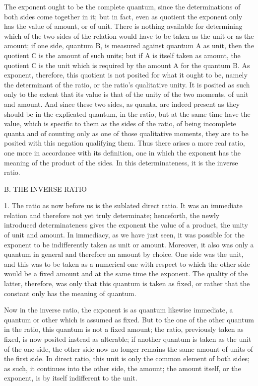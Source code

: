 The exponent ought to be the complete quantum,
since the determinations of both sides come together in it;
but in fact, even as quotient the exponent
only has the value of amount, or of unit.
There is nothing available for determining
which of the two sides of the relation would have to
be taken as the unit or as the amount;
if one side, quantum B,
is measured against quantum A as unit,
then the quotient C is the amount of such units;
but if A is itself taken as amount,
the quotient C is the unit which is required by
the amount A for the quantum B.
As exponent, therefore, this quotient is
not posited for what it ought to be,
namely the determinant of the ratio,
or the ratio's qualitative unity.
It is posited as such only to
the extent that its value is that
of the unity of the two moments,
of unit and amount.
And since these two sides, as quanta,
are indeed present as they should be
in the explicated quantum, in the ratio,
but at the same time have the value,
which is specific to them as the sides of the ratio,
of being incomplete quanta and of counting
only as one of those qualitative moments,
they are to be posited with this negation qualifying them.
Thus there arises a more real ratio,
one more in accordance with its definition,
one in which the exponent has the meaning
of the product of the sides.
In this determinateness,
it is the inverse ratio.

B. THE INVERSE RATIO

1. The ratio as now before us is the sublated direct ratio.
It was an immediate relation and therefore not yet truly determinate;
henceforth, the newly introduced determinateness gives
the exponent the value of a product,
the unity of unit and amount.
In immediacy, as we have just seen,
it was possible for the exponent to be
indifferently taken as unit or amount.
Moreover, it also was only a quantum in general
and therefore an amount by choice.
One side was the unit,
and this was to be taken as a numerical one
with respect to which the other side would be a fixed amount
and at the same time the exponent.
The quality of the latter, therefore,
was only that this quantum is taken as fixed,
or rather that the constant only
has the meaning of quantum.

Now in the inverse ratio,
the exponent is as quantum likewise immediate,
a quantum or other which is assumed as fixed.
But to the one of the other quantum in the ratio,
this quantum is not a fixed amount; the ratio,
previously taken as fixed, is now posited instead as alterable;
if another quantum is taken as
the unit of the one side,
the other side now no longer remains
the same amount of units of the first side.
In direct ratio, this unit
is only the common element of both sides;
as such, it continues into the other side, the amount;
the amount itself, or the exponent,
is by itself indifferent to the unit.

